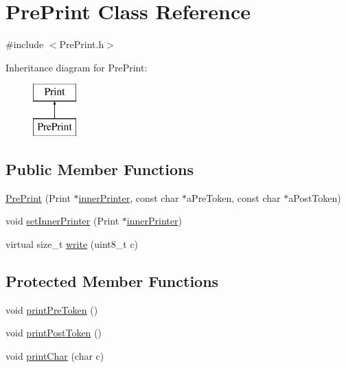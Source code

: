 \hypertarget{class_pre_print}{}\section{Pre\+Print Class Reference}
\label{class_pre_print}


{\ttfamily \#include $<$Pre\+Print.\+h$>$}

Inheritance diagram for Pre\+Print\+:\begin{figure}[H]
\begin{center}
\leavevmode
\includegraphics[height=2.000000cm]{class_pre_print}
\end{center}
\end{figure}
\subsection*{Public Member Functions}
\begin{DoxyCompactItemize}
\item 
\hyperlink{class_pre_print_a6062e08cf52ab0bacc9af9f0ea060d6d}{Pre\+Print} (Print $\ast$\hyperlink{class_pre_print_a2864325a5347e151969f30e3139d68ef}{inner\+Printer}, const char $\ast$a\+Pre\+Token, const char $\ast$a\+Post\+Token)
\item 
void \hyperlink{class_pre_print_aeb453f39e57d53c0a4fa1bdc7284209f}{set\+Inner\+Printer} (Print $\ast$\hyperlink{class_pre_print_a2864325a5347e151969f30e3139d68ef}{inner\+Printer})
\item 
virtual size\+\_\+t \hyperlink{class_pre_print_aa1a6239b213974765a39a304c18b8df3}{write} (uint8\+\_\+t c)
\end{DoxyCompactItemize}
\subsection*{Protected Member Functions}
\begin{DoxyCompactItemize}
\item 
void \hyperlink{class_pre_print_a9740712f07374dfda00d46ebf0730efc}{print\+Pre\+Token} ()
\item 
void \hyperlink{class_pre_print_a3f2ab5d0d1d614b4acf47f4ef566e428}{print\+Post\+Token} ()
\item 
void \hyperlink{class_pre_print_ac8b43aee74a660f18f3f290fc13af31e}{print\+Char} (char c)
\end{DoxyCompactItemize}
